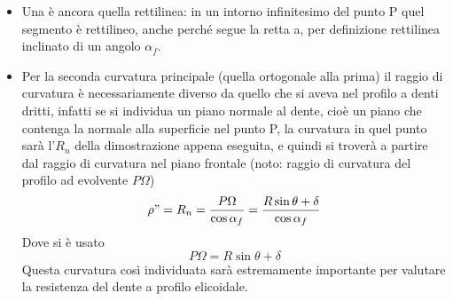 \documentclass[a4paper, 15pt]{article}
\begin{document}
\begin{adjustwidth}{2in}{}
\begin{itemize}
	\item Una è ancora quella rettilinea: in un intorno infinitesimo del punto P quel segmento è rettilineo, anche perché segue la retta a, per definizione rettilinea inclinato di un angolo $\alpha_f$. 
	
	\item Per la seconda curvatura principale (quella ortogonale alla prima) il raggio di curvatura è necessariamente diverso da quello che si aveva nel profilo a denti dritti, infatti se si individua un piano normale al dente, cioè un piano che contenga la normale alla superficie nel punto P,  la curvatura in quel punto sarà l'$R_n$ della dimostrazione appena eseguita, e quindi si troverà a partire dal raggio di curvatura nel piano frontale (noto: raggio di curvatura del profilo ad evolvente $P\Omega$)
	\[\rho" = R_n = \dfrac{P\Omega}{\cos\alpha_f} = \dfrac{R\sin\theta + \delta}{\cos\alpha_f}\] 
	Dove si è usato 
	\[P\Omega = R\sin\theta + \delta\]	
	Questa curvatura così individuata sarà estremamente importante per valutare la resistenza del dente a profilo elicoidale. 
\end{itemize}	
\end{adjustwidth}
\end{document}
